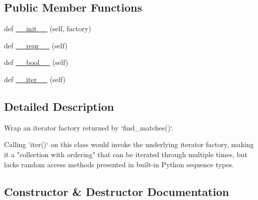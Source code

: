 \subsection*{Public Member Functions}
\begin{DoxyCompactItemize}
\item 
def \hyperlink{classpip_1_1__vendor_1_1resolvelib_1_1structs_1_1__FactoryIterableView_acb399900b2c738d43f9828ad3263c9f9}{\+\_\+\+\_\+init\+\_\+\+\_\+} (self, factory)
\item 
def \hyperlink{classpip_1_1__vendor_1_1resolvelib_1_1structs_1_1__FactoryIterableView_a7ef459108eef256df6d991bffb859be4}{\+\_\+\+\_\+repr\+\_\+\+\_\+} (self)
\item 
def \hyperlink{classpip_1_1__vendor_1_1resolvelib_1_1structs_1_1__FactoryIterableView_a01d56586edd1d1cae9ad37a25c6a0d8f}{\+\_\+\+\_\+bool\+\_\+\+\_\+} (self)
\item 
def \hyperlink{classpip_1_1__vendor_1_1resolvelib_1_1structs_1_1__FactoryIterableView_a43ea5bfbaaf13af6272b8b1f089c4112}{\+\_\+\+\_\+iter\+\_\+\+\_\+} (self)
\end{DoxyCompactItemize}


\subsection{Detailed Description}
\begin{DoxyVerb}Wrap an iterator factory returned by `find_matches()`.

Calling `iter()` on this class would invoke the underlying iterator
factory, making it a "collection with ordering" that can be iterated
through multiple times, but lacks random access methods presented in
built-in Python sequence types.
\end{DoxyVerb}
 

\subsection{Constructor \& Destructor Documentation}
\mbox{\label{classpip_1_1__vendor_1_1resolvelib_1_1structs_1_1__FactoryIterableView_acb399900b2c738d43f9828ad3263c9f9}} 
